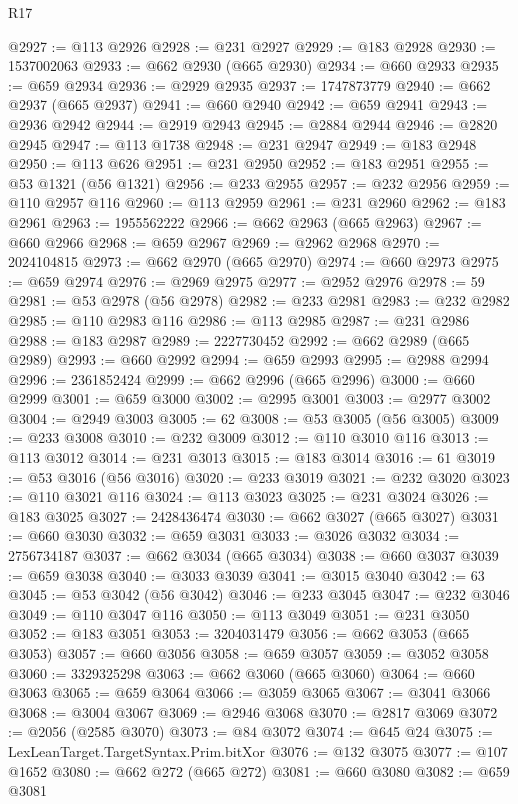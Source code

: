 \begin{lexlean}{R17}
\begin{coremodule}
@2927 := @113 @2926
@2928 := @231 @2927
@2929 := @183 @2928
@2930 := 1537002063
@2933 := @662 @2930 (@665 @2930)
@2934 := @660 @2933
@2935 := @659 @2934
@2936 := @2929 @2935
@2937 := 1747873779
@2940 := @662 @2937 (@665 @2937)
@2941 := @660 @2940
@2942 := @659 @2941
@2943 := @2936 @2942
@2944 := @2919 @2943
@2945 := @2884 @2944
@2946 := @2820 @2945
@2947 := @113 @1738
@2948 := @231 @2947
@2949 := @183 @2948
@2950 := @113 @626
@2951 := @231 @2950
@2952 := @183 @2951
@2955 := @53 @1321 (@56 @1321)
@2956 := @233 @2955
@2957 := @232 @2956
@2959 := @110 @2957 @116
@2960 := @113 @2959
@2961 := @231 @2960
@2962 := @183 @2961
@2963 := 1955562222
@2966 := @662 @2963 (@665 @2963)
@2967 := @660 @2966
@2968 := @659 @2967
@2969 := @2962 @2968
@2970 := 2024104815
@2973 := @662 @2970 (@665 @2970)
@2974 := @660 @2973
@2975 := @659 @2974
@2976 := @2969 @2975
@2977 := @2952 @2976
@2978 := 59
@2981 := @53 @2978 (@56 @2978)
@2982 := @233 @2981
@2983 := @232 @2982
@2985 := @110 @2983 @116
@2986 := @113 @2985
@2987 := @231 @2986
@2988 := @183 @2987
@2989 := 2227730452
@2992 := @662 @2989 (@665 @2989)
@2993 := @660 @2992
@2994 := @659 @2993
@2995 := @2988 @2994
@2996 := 2361852424
@2999 := @662 @2996 (@665 @2996)
@3000 := @660 @2999
@3001 := @659 @3000
@3002 := @2995 @3001
@3003 := @2977 @3002
@3004 := @2949 @3003
@3005 := 62
@3008 := @53 @3005 (@56 @3005)
@3009 := @233 @3008
@3010 := @232 @3009
@3012 := @110 @3010 @116
@3013 := @113 @3012
@3014 := @231 @3013
@3015 := @183 @3014
@3016 := 61
@3019 := @53 @3016 (@56 @3016)
@3020 := @233 @3019
@3021 := @232 @3020
@3023 := @110 @3021 @116
@3024 := @113 @3023
@3025 := @231 @3024
@3026 := @183 @3025
@3027 := 2428436474
@3030 := @662 @3027 (@665 @3027)
@3031 := @660 @3030
@3032 := @659 @3031
@3033 := @3026 @3032
@3034 := 2756734187
@3037 := @662 @3034 (@665 @3034)
@3038 := @660 @3037
@3039 := @659 @3038
@3040 := @3033 @3039
@3041 := @3015 @3040
@3042 := 63
@3045 := @53 @3042 (@56 @3042)
@3046 := @233 @3045
@3047 := @232 @3046
@3049 := @110 @3047 @116
@3050 := @113 @3049
@3051 := @231 @3050
@3052 := @183 @3051
@3053 := 3204031479
@3056 := @662 @3053 (@665 @3053)
@3057 := @660 @3056
@3058 := @659 @3057
@3059 := @3052 @3058
@3060 := 3329325298
@3063 := @662 @3060 (@665 @3060)
@3064 := @660 @3063
@3065 := @659 @3064
@3066 := @3059 @3065
@3067 := @3041 @3066
@3068 := @3004 @3067
@3069 := @2946 @3068
@3070 := @2817 @3069
@3072 := @2056 (@2585 @3070)
@3073 := @84 @3072
@3074 := @645 @24
@3075 := LexLeanTarget.TargetSyntax.Prim.bitXor
@3076 := @132 @3075
@3077 := @107 @1652
@3080 := @662 @272 (@665 @272)
@3081 := @660 @3080
@3082 := @659 @3081

\end{coremodule}
\end{lexlean}
